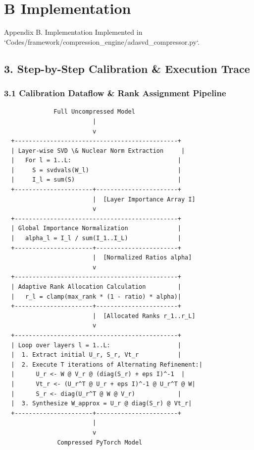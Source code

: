 \section{B Implementation}

 Appendix B. Implementation
Implemented in `Codes/framework/compression\_engine/adasvd\_compressor.py`.



\subsection{3. Step-by-Step Calibration \& Execution Trace}
\subsubsection{3.1 Calibration Dataflow \& Rank Assignment Pipeline}


\begin{lstlisting}
              Full Uncompressed Model
                         |
                         v
  +----------------------------------------------+
  | Layer-wise SVD \& Nuclear Norm Extraction     |
  |   For l = 1..L:                              |
  |     S = svdvals(W_l)                         |
  |     I_l = sum(S)                             |
  +----------------------+-----------------------+
                         |  [Layer Importance Array I]
                         v
  +----------------------------------------------+
  | Global Importance Normalization              |
  |   alpha_l = I_l / sum(I_1..I_L)              |
  +----------------------+-----------------------+
                         |  [Normalized Ratios alpha]
                         v
  +----------------------------------------------+
  | Adaptive Rank Allocation Calculation         |
  |   r_l = clamp(max_rank * (1 - ratio) * alpha)|
  +----------------------+-----------------------+
                         |  [Allocated Ranks r_1..r_L]
                         v
  +----------------------------------------------+
  | Loop over layers l = 1..L:                   |
  |  1. Extract initial U_r, S_r, Vt_r           |
  |  2. Execute T iterations of Alternating Refinement:|
  |      U_r <- W @ V_r @ (diag(S_r) + eps I)^-1  |
  |      Vt_r <- (U_r^T @ U_r + eps I)^-1 @ U_r^T @ W|
  |      S_r <- diag(U_r^T @ W @ V_r)            |
  |  3. Synthesize W_approx = U_r @ diag(S_r) @ Vt_r|
  +----------------------+-----------------------+
                         |
                         v
               Compressed PyTorch Model
\end{lstlisting}


